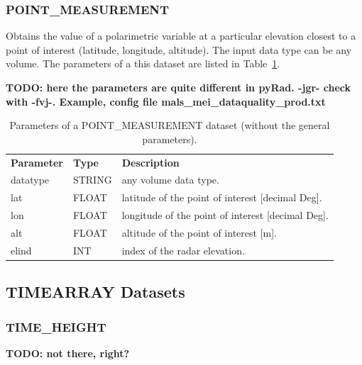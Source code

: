\documentclass[a4paper,11pt,pdftex,twoside]{scrartcl}
\renewcommand{\bf}{\normalfont \bfseries}
\begin{document}
{{{\subsubsection{POINT\_MEASUREMENT}
\label{subsec_point_measurement}
Obtains the value of a polarimetric variable at a particular elevation closest to a point of interest
(latitude, longitude, altitude). The input data type can be any volume. The parameters of a this dataset
are listed in Table~\ref{tab_dataset_point_measurement}.

{\bf TODO: here the parameters are quite different in pyRad. -jgr- check with -fvj-. Example, config file mals\_mei\_dataquality\_prod.txt}

\begin{table}[H]
\begin{tabularx}{\textwidth}{llX}
\bf{Parameter}  & \bf{Type}  & \bf{Description}\\
datatype       & STRING     & any volume data type.\\
lat   & FLOAT      &  latitude of the point of interest [decimal Deg].\\
lon   & FLOAT      &  longitude of the point of interest [decimal Deg].\\
alt   & FLOAT      &  altitude of the point of interest [m].\\
elind   & INT      &  index of the radar elevation.\\
\end{tabularx}
\caption{Parameters of a POINT\_MEASUREMENT dataset (without the general parameters).}
\label{tab_dataset_point_measurement}
\end{table}

\subsection{TIMEARRAY Datasets}

\subsubsection{TIME\_HEIGHT}
\label{subsec_time_height}

{\bf TODO: not there, right?}

}}}
\end{document}
